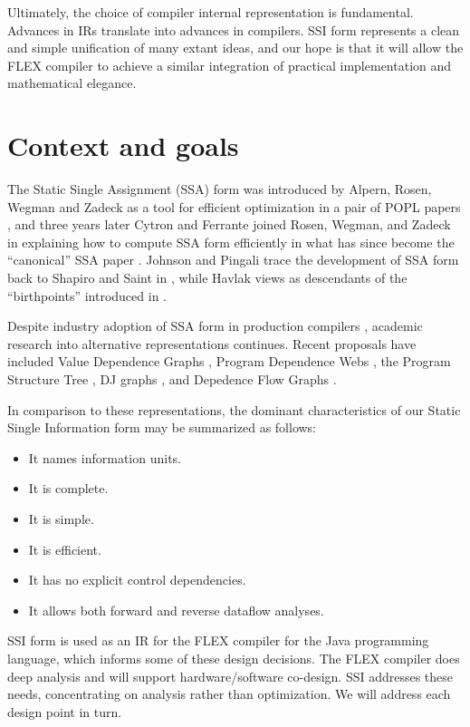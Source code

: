 \documentclass[12pt,titlepage]{article}
\newcommand{\mysection}[1]{\section{#1}\setcounter{figure}{0}}
\begin{document}
Ultimately, the choice of compiler internal representation is fundamental.
Advances in IRs translate into advances in compilers.  SSI form
represents a clean and simple unification of many extant ideas, and
our hope is that it will allow the FLEX compiler to achieve a similar
integration of practical implementation and mathematical elegance.

\mysection{Context and goals}
The Static Single Assignment (SSA) form was introduced by 
Alpern, Rosen, Wegman and Zadeck
as a tool for efficient optimization in a pair of POPL
papers \cite{alpern88:ssa,rosen88:gvn}, and three years later Cytron
and Ferrante joined Rosen, Wegman, and Zadeck in explaining how to
compute SSA form efficiently in what has since become the 
``canonical'' SSA paper \cite{cytron89:ssa}.  Johnson and Pingali
\cite{johnson93:dfg} trace the development of SSA form back to Shapiro
and Saint in \cite{shapiro70:ssa}, while Havlak \cite{havlak94:isa}
views  as descendants of the ``birthpoints'' introduced
in \cite{reif81:sym}.

Despite industry adoption of SSA form in production compilers
\cite{chow97:ssapre,chow96:hssa}, academic research into alternative
representations continues.
Recent proposals have included Value Dependence Graphs
\cite{weise94:vdg}, Program Dependence Webs \cite{ballance90:pdw},
the Program Structure Tree \cite{johnson94:pst},
DJ graphs \cite{sreedhar96:dj}, and Depedence Flow Graphs
\cite{johnson93:dfg}.

In comparison to these representations, the dominant characteristics of
our Static Single Information form may be summarized as follows:
\begin{itemize}
\item It names information units.
\item It is complete.
\item It is simple.
\item It is efficient.
\item It has no explicit control dependencies.
\item It allows both forward and reverse dataflow analyses.
\end{itemize}
SSI form is used as an IR for the FLEX compiler for the Java
programming language, which informs some of these design decisions.
The FLEX compiler does deep analysis and will support
hardware/software co-design.  SSI addresses these needs, concentrating
on analysis rather than optimization.  We will address each design
point in turn.
\end{document}
